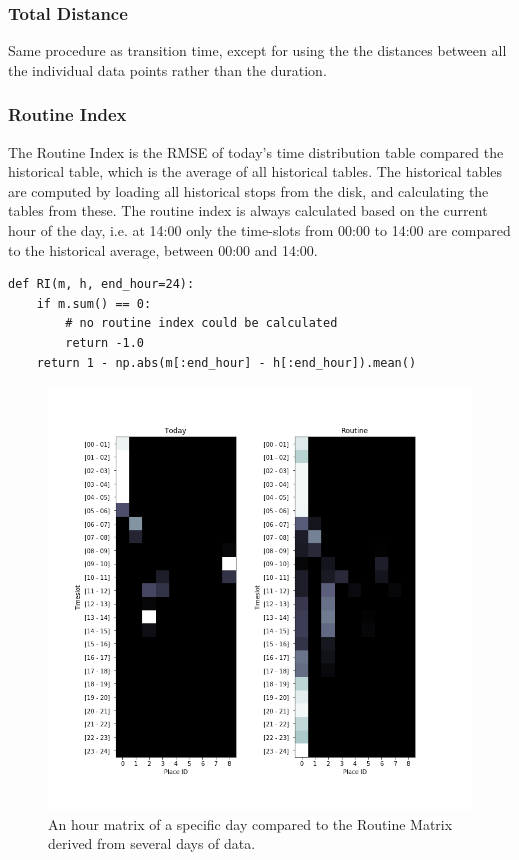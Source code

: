 \subsubsection{Total Distance} 
Same procedure as transition time, except for using the the distances between all the individual data points rather than the duration.

\subsubsection{Routine Index} 
The Routine Index is the RMSE of today's time distribution table compared the historical table, which is the average of all historical tables. The historical tables are computed by loading all historical stops from the disk, and calculating the tables from these. The routine index is always calculated based on the current hour of the day, i.e. at 14:00 only the time-slots from 00:00 to 14:00 are compared to the historical average, between 00:00 and 14:00. 

\begin{verbatim}
def RI(m, h, end_hour=24):
    if m.sum() == 0:
        # no routine index could be calculated
        return -1.0 
    return 1 - np.abs(m[:end_hour] - h[:end_hour]).mean()
\end{verbatim}

\begin{figure}
    \centering
    \includegraphics[width=\textwidth]{images/routine.png}
    \caption{An hour matrix of a specific day compared to the Routine Matrix derived from several days of data.}
    \label{fig:routine_example}
\end{figure}


